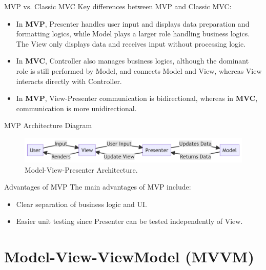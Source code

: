 \documentclass[aspectratio=169, table]{beamer}
\begin{document}
\begin{frame}[fragile]{MVP vs. Classic MVC}
	\vspace{20pt}
	Key differences between MVP and Classic MVC:
	\begin{itemize}
		\item In \textbf{MVP}, Presenter handles user input and displays data preparation and formatting logics, while Model plays a larger role handling business logics. The View only displays data and receives input without processing logic.
		\item In \textbf{MVC}, Controller also manages business logics, although the dominant role is still performed by Model, and connects Model and View, whereas View interacts directly with Controller.
		\item In \textbf{MVP}, View-Presenter communication is bidirectional, whereas in \textbf{MVC}, communication is more unidirectional.
	\end{itemize}
\end{frame}

\begin{frame}[fragile]{MVP Architecture Diagram}
	\vspace{20pt}
	\begin{figure}[h]
		\centering
		\includegraphics[width=\textwidth]{../images/mvp.png}
		\caption{Model-View-Presenter Architecture.}
		\label{fig:mvp-architecture}
	\end{figure}
\end{frame}

\begin{frame}[fragile]{Advantages of MVP}
	\vspace{20pt}
	The main advantages of MVP include:
	\begin{itemize}
		\item Clear separation of business logic and UI.
		\item Easier unit testing since Presenter can be tested independently of View.
	\end{itemize}
\end{frame}

\section{Model-View-ViewModel (MVVM)}
\end{document}

